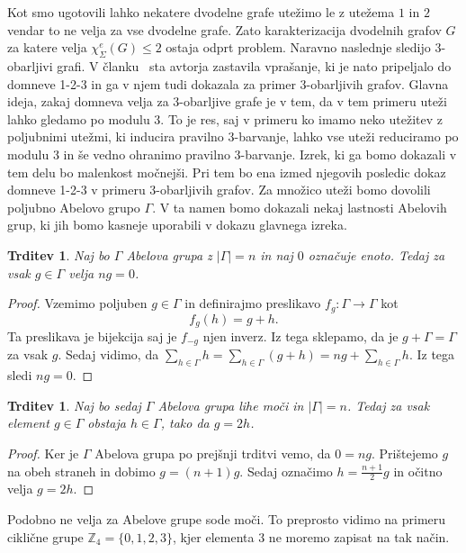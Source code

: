 \documentclass[12pt,a4paper,twoside]{article}
\theoremstyle{definition} %
\theoremstyle{plain} %
\newtheorem{trditev}[definicija]{Trditev}
\newcommand{\ec}{\chi_{\Sigma}^e}
\numberwithin{equation}{section}  %
\begin{document}
 Kot smo ugotovili lahko nekatere dvodelne grafe utežimo le z utežema $1$ in $2$ vendar to ne velja za vse dvodelne grafe. Zato karakterizacija dvodelnih grafov $G$ za katere velja $\ec(G) \le 2$ ostaja odprt problem. Naravno naslednje sledijo $3$-obarljivi grafi. 
  V članku~\citet{base}  sta  avtorja zastavila vprašanje, ki je nato pripeljalo do domneve 1-2-3 in ga v njem tudi dokazala za primer $3$-obarljivih grafov. Glavna ideja, zakaj domneva velja za 3-obarljive grafe je v tem, da v tem primeru uteži lahko gledamo po modulu 3. To je res, saj v primeru ko imamo neko utežitev z poljubnimi utežmi, ki inducira pravilno 3-barvanje, lahko vse uteži reduciramo po modulu 3 in še vedno ohranimo pravilno 3-barvanje. Izrek, ki ga bomo dokazali v tem delu bo malenkost močnejši. Pri tem bo ena izmed njegovih posledic dokaz domneve 1-2-3 v primeru 3-obarljivih grafov. Za množico uteži bomo dovolili poljubno Abelovo grupo $\Gamma$. V ta namen bomo dokazali nekaj lastnosti Abelovih grup, ki jih bomo kasneje uporabili v dokazu glavnega izreka.
  \begin{trditev}
  	Naj bo $\Gamma$ Abelova grupa z $|\Gamma| = n$ in naj $0$ označuje enoto. Tedaj za vsak $g \in \Gamma$ velja $n g = 0$.
  \end{trditev}

\begin{proof}
	Vzemimo poljuben $g \in \Gamma$ in definirajmo preslikavo $f_g : \Gamma \rightarrow \Gamma$ kot
	$$f_g(h) = g + h .$$
	Ta preslikava je bijekcija saj je $f_{-g}$ njen inverz. Iz tega sklepamo, da je $ g + \Gamma = \Gamma$ za vsak $g$. Sedaj vidimo, da $ \sum_{h \in \Gamma} h = \sum_{h \in \Gamma} (g + h) = ng + \sum_{h \in \Gamma} h$. Iz tega sledi $ng = 0$.
\end{proof}


\begin{trditev}
	Naj bo sedaj $\Gamma$ Abelova grupa lihe moči in $|\Gamma| = n$. Tedaj za vsak element $g \in \Gamma$ obstaja $h \in \Gamma$, tako da $g = 2h$.
\end{trditev}

\begin{proof}
	Ker je $\Gamma$ Abelova grupa po prejšnji trditvi vemo, da $ 0 = ng$. Prištejemo $g$ na obeh straneh in dobimo $g = (n+1)g$. Sedaj označimo $h = \frac{n + 1}{2}g$ in očitno velja $g = 2h$.
\end{proof}

Podobno ne velja za Abelove grupe sode moči. To preprosto vidimo na primeru ciklične grupe $\mathbb{Z}_4 = \{0,1,2,3\}$, kjer elementa $3$ ne moremo zapisat na tak način.
\end{document}
